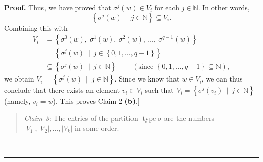 \documentclass[numbers=enddot,12pt,final,onecolumn,notitlepage]{scrartcl}%
\numberwithin{exer}{section}
\theoremstyle{definition}
\newenvironment{statement}{\begin{quote}}{\end{quote}}
\newenvironment{proof}[1][Proof]{\noindent\textbf{#1.} }{\ \rule{0.5em}{0.5em}}
\newenvironment{verlong}{}{}
\begin{document}
\begin{verlong}
\begin{proof}
Thus, we have proved that $\sigma^{j}\left(  w\right)  \in V_{i}$ for each
$j\in\mathbb{N}$. In other words,%
\[
\left\{  \sigma^{j}\left(  w\right)  \ \mid\ j\in\mathbb{N}\right\}  \subseteq
V_{i}.
\]
Combining this with%
\begin{align*}
V_{i}  &  =\left\{  \sigma^{0}\left(  w\right)  ,\ \sigma^{1}\left(  w\right)
,\ \sigma^{2}\left(  w\right)  ,\ \ldots,\ \sigma^{q-1}\left(  w\right)
\right\} \\
&  =\left\{  \sigma^{j}\left(  w\right)  \ \mid\ j\in\left\{  0,1,\ldots
,q-1\right\}  \right\} \\
&  \subseteq\left\{  \sigma^{j}\left(  w\right)  \ \mid\ j\in\mathbb{N}%
\right\}  \ \ \ \ \ \ \ \ \ \ \left(  \text{since }\left\{  0,1,\ldots
,q-1\right\}  \subseteq\mathbb{N}\right)  ,
\end{align*}
we obtain $V_{i}=\left\{  \sigma^{j}\left(  w\right)  \ \mid\ j\in
\mathbb{N}\right\}  $. Since we know that $w\in V_{i}$, we can thus conclude
that there exists an element $v_{i}\in V_{i}$ such that $V_{i}=\left\{
\sigma^{j}\left(  v_{i}\right)  \ \mid\ j\in\mathbb{N}\right\}  $ (namely,
$v_{i}=w$). This proves Claim 2 \textbf{(b)}.] \medskip

\begin{statement}
\textit{Claim 3:} The entries of the partition $\operatorname*{type}\sigma$
are the numbers $\left\vert V_{1}\right\vert ,\left\vert V_{2}\right\vert
,\ldots,\left\vert V_{k}\right\vert $ in some order.
\end{statement}


\end{proof}
\end{verlong}
\end{document}
